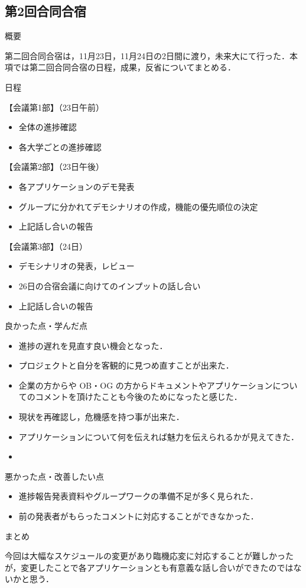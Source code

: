 \subsection{第2回合同合宿}
\par
概要
\par 
第二回合同合宿は，11月23日，11月24日の2日間に渡り，未来大にて行った．本項では第二回合同合宿の日程，成果，反省についてまとめる．
\par
日程
\par
【会議第1部】（23日午前）
\begin{itemize}
\item 全体の進捗確認
\item 各大学ごとの進捗確認
\end{itemize}
【会議第2部】（23日午後）
\begin{itemize}
\item 各アプリケーションのデモ発表
\item グループに分かれてデモシナリオの作成，機能の優先順位の決定
\item 上記話し合いの報告
\end{itemize}
【会議第3部】（24日）
\begin{itemize}
\item デモシナリオの発表，レビュー
\item 26日の合宿会議に向けてのインプットの話し合い
\item 上記話し合いの報告
\end{itemize}

\par
良かった点・学んだ点
\begin{itemize}
\item 進捗の遅れを見直す良い機会となった．
\item プロジェクトと自分を客観的に見つめ直すことが出来た．
\item 企業の方からや OB・OG の方からドキュメントやアプリケーションについてのコメントを頂けたことも今後のためになったと感じた．
\item 現状を再確認し，危機感を持つ事が出来た．
\item アプリケーションについて何を伝えれば魅力を伝えられるかが見えてきた．
\item 
\end{itemize}
\par
悪かった点・改善したい点
\begin{itemize}
\item 進捗報告発表資料やグループワークの準備不足が多く見られた．
\item 前の発表者がもらったコメントに対応することができなかった．
\end{itemize}
\par
まとめ
\par 今回は大幅なスケジュールの変更があり臨機応変に対応することが難しかったが，変更したことで各アプリケーションとも有意義な話し合いができたのではないかと思う．

